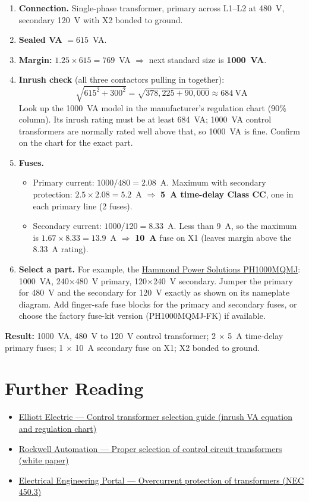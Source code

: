 \begin{enumerate}[itemsep=4pt]
  \item \textbf{Connection.} Single-phase transformer, primary across L1--L2 at 480~V, secondary 120~V with X2 bonded to ground.
  \item \textbf{Sealed VA} $= 615$~VA.
  \item \textbf{Margin:} $1.25 \times 615 = 769$~VA $\Rightarrow$ next standard size is \textbf{1000~VA}.
  \item \textbf{Inrush check} (all three contactors pulling in together):
  \[
    \sqrt{615^2 + 300^2} = \sqrt{378{,}225 + 90{,}000} \approx 684~\text{VA}
  \]
  Look up the 1000~VA model in the manufacturer's regulation chart (90\% column). Its inrush rating must be at least 684~VA; 1000~VA control transformers are normally rated well above that, so 1000~VA is fine. Confirm on the chart for the exact part.
  \item \textbf{Fuses.}
  \begin{itemize}[itemsep=1pt]
    \item Primary current: $1000 / 480 = 2.08$~A. Maximum with secondary protection: $2.5 \times 2.08 = 5.2$~A $\Rightarrow$ \textbf{5~A time-delay Class CC}, one in each primary line (2 fuses).
    \item Secondary current: $1000 / 120 = 8.33$~A. Less than 9~A, so the maximum is $1.67 \times 8.33 = 13.9$~A $\Rightarrow$ \textbf{10~A} fuse on X1 (leaves margin above the 8.33~A rating).
  \end{itemize}
  \item \textbf{Select a part.} For example, the \href{https://www.lamonde.com/ph1000mqmj.html}{Hammond Power Solutions PH1000MQMJ}: 1000~VA, 240$\times$480~V primary, 120$\times$240~V secondary. Jumper the primary for 480~V and the secondary for 120~V exactly as shown on its nameplate diagram. Add finger-safe fuse blocks for the primary and secondary fuses, or choose the factory fuse-kit version (PH1000MQMJ-FK) if available.
\end{enumerate}

\textbf{Result:} 1000~VA, 480~V to 120~V control transformer; 2 $\times$ 5~A time-delay primary fuses; 1 $\times$ 10~A secondary fuse on X1; X2 bonded to ground.

\section{Further Reading}
\begin{itemize}[itemsep=2pt]
  \item \href{https://www.elliottelectric.com/StaticPages/ElectricalReferences/Guides/control-transformer-selection-guide.aspx}{Elliott Electric --- Control transformer selection guide (inrush VA equation and regulation chart)}
  \item \href{https://literature.rockwellautomation.com/idc/groups/literature/documents/wp/1497-wp001_-en-p.pdf}{Rockwell Automation --- Proper selection of control circuit transformers (white paper)}
  \item \href{https://electrical-engineering-portal.com/overcurrent-protection-transformer-nec-450-3}{Electrical Engineering Portal --- Overcurrent protection of transformers (NEC 450.3)}
\end{itemize}
